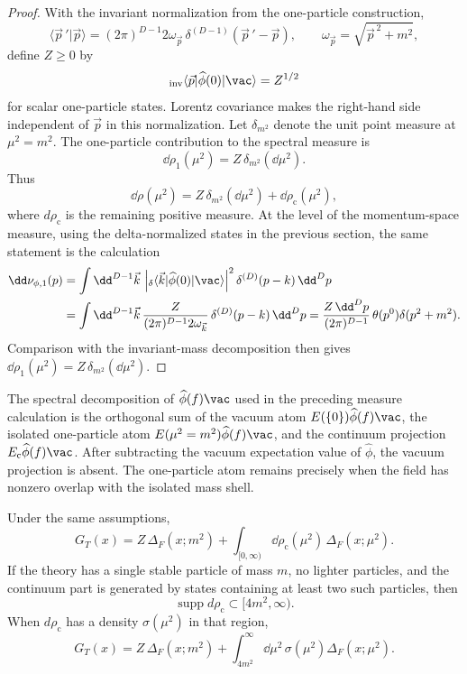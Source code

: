 \begin{proof}
With the invariant normalization from the one-particle construction,
\[
  \langle\vec p\,{}'|\vec p\rangle
  =
  (2\pi)^{D-1}2\omega_{\vec p}\,
  \delta^{(D-1)}(\vec p\,{}'-\vec p),
  \qquad
  \omega_{\vec p}=\sqrt{\vec p^{\,2}+m^2},
\]
define \(Z\ge0\) by
\[
  {}_{\rm inv}\langle\vec p|\widehat\phi(0)|\vac\rangle=Z^{1/2}
\]
for scalar one-particle states. Lorentz covariance makes the right-hand side
independent of \(\vec p\) in this normalization. Let \(\delta_{m^2}\) denote
the unit point measure at \(\mu^2=m^2\). The one-particle contribution to the
spectral measure is
\[
  \dd\rho_1(\mu^2)=Z\,\delta_{m^2}(\dd\mu^2).
\]
Thus
\[
  \dd\rho(\mu^2)
  =
  Z\,\delta_{m^2}(\dd\mu^2)
  +
  \dd\rho_{\mathrm c}(\mu^2),
\]
where \(d\rho_{\mathrm c}\) is the remaining positive measure.
At the level of the momentum-space measure, using the delta-normalized states
in the previous section, the same statement is the calculation
\[
\begin{aligned}
  \dd\nu_{\phi,1}(p)
  &=
  \int\dd^{D-1}\vec k\,
  \left|
    {}_\delta\langle\vec k|\widehat\phi(0)|\vac\rangle
  \right|^2
  \delta^{(D)}(p-k)\,\dd^Dp
  \\
  &=
  \int\dd^{D-1}\vec k\,
  \frac{Z}{(2\pi)^{D-1}2\omega_{\vec k}}\,
  \delta^{(D)}(p-k)\,\dd^Dp
  =
  \frac{Z\,\dd^Dp}{(2\pi)^{D-1}}\,
  \theta(p^0)\delta(p^2+m^2).
\end{aligned}
\]
Comparison with the invariant-mass decomposition then gives
\(\dd\rho_1(\mu^2)=Z\,\delta_{m^2}(\dd\mu^2)\).
\end{proof}

The spectral decomposition of \(\widehat\phi(f)\vac\) used in the preceding
measure calculation is the orthogonal sum of the vacuum atom
\(E(\{0\})\widehat\phi(f)\vac\), the isolated one-particle atom
\(E(\mu^2=m^2)\widehat\phi(f)\vac\), and the continuum projection
\(E_{\mathrm c}\widehat\phi(f)\vac\).  After subtracting the vacuum
expectation value of \(\widehat\phi\), the vacuum projection is absent.  The
one-particle atom remains precisely when the field has nonzero overlap with
the isolated mass shell.

Under the same assumptions,
\[
  G_T(x)
  =
  Z\,\Delta_F(x;m^2)
  +
  \int_{[0,\infty)}
  \dd\rho_{\mathrm c}(\mu^2)\,
  \Delta_F(x;\mu^2).
\]
If the theory has a single stable particle of mass \(m\), no lighter
particles, and the continuum part is generated by states containing at least
two such particles, then
\[
  \operatorname{supp}d\rho_{\mathrm c}\subset[4m^2,\infty).
\]
When \(d\rho_{\mathrm c}\) has a density \(\sigma(\mu^2)\) in that region,
\[
  G_T(x)
  =
  Z\,\Delta_F(x;m^2)
  +
  \int_{4m^2}^{\infty}
  \dd\mu^2\,\sigma(\mu^2)\Delta_F(x;\mu^2).
\]

